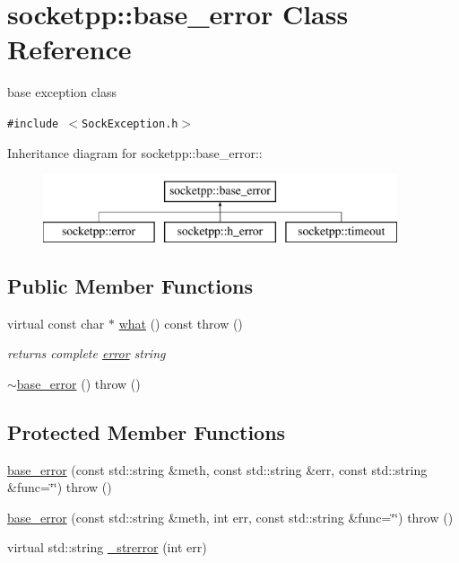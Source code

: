 \hypertarget{classsocketpp_1_1base__error}{
\section{socketpp::base\_\-error Class Reference}
\label{classsocketpp_1_1base__error}
}
base exception class  


{\tt \#include $<$SockException.h$>$}

Inheritance diagram for socketpp::base\_\-error::\begin{figure}[H]
\begin{center}
\leavevmode
\includegraphics[height=2cm]{classsocketpp_1_1base__error}
\end{center}
\end{figure}
\subsection*{Public Member Functions}
\begin{CompactItemize}
\item 
virtual const char $\ast$ \hyperlink{classsocketpp_1_1base__error_a25ad5c1a163784dc72317790ea9c499}{what} () const   throw ()
\begin{CompactList}\small\item\em returns complete \hyperlink{classsocketpp_1_1error}{error} string \item\end{CompactList}\item 
\hyperlink{classsocketpp_1_1base__error_2e6c4d48d426926c79d86a610ba3029b}{$\sim$base\_\-error} ()  throw ()
\end{CompactItemize}
\subsection*{Protected Member Functions}
\begin{CompactItemize}
\item 
\hyperlink{classsocketpp_1_1base__error_bee6b6851dbaecf96259bd2dcaa84ef9}{base\_\-error} (const std::string \&meth, const std::string \&err, const std::string \&func=\char`\"{}\char`\"{})  throw ()
\item 
\hyperlink{classsocketpp_1_1base__error_4be3a2a0a278b7b3ab0e494af7406573}{base\_\-error} (const std::string \&meth, int err, const std::string \&func=\char`\"{}\char`\"{})  throw ()
\item 
virtual std::string \hyperlink{classsocketpp_1_1base__error_2ed9790fc343de92333ab1f0239ffb5f}{\_\-strerror} (int err)
\end{CompactItemize}
